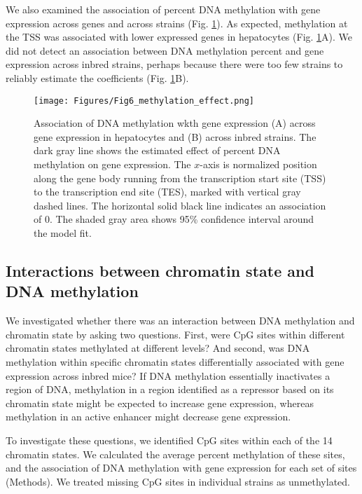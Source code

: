 \documentclass[
  11pt,
]{article}
\begin{document}
We also examined the association of percent DNA methylation with gene
expression across genes and across strains (Fig.
\ref{fig:DNA_methylation_effect}). As expected, methylation at the TSS
was associated with lower expressed genes in hepatocytes (Fig.
\ref{fig:DNA_methylation_effect}A). We did not detect an association
between DNA methylation percent and gene expression across inbred
strains, perhaps because there were too few strains to reliably estimate
the coefficients (Fig. \ref{fig:DNA_methylation_effect}B).

\begin{figure}[ht!]
\texttt{[image: Figures/Fig6\_methylation\_effect.png]} 
\caption{Association of DNA methylation wkth gene expression (A) across 
gene expression in hepatocytes and (B) across inbred strains. The dark 
gray line shows the estimated effect of percent DNA methylation on gene 
expression. The $x$-axis is normalized position along the gene body 
running from the transcription start site (TSS) to the transcription 
end site (TES), marked with vertical gray dashed lines. The horizontal 
solid black line indicates an association of 0. The shaded gray area shows 
95\% confidence interval around the model fit.}
\label{fig:DNA_methylation_effect}
\end{figure}

\hypertarget{interactions-between-chromatin-state-and-dna-methylation}{%
\subsection{Interactions between chromatin state and DNA
methylation}\label{interactions-between-chromatin-state-and-dna-methylation}}

We investigated whether there was an interaction between DNA methylation
and chromatin state by asking two questions. First, were CpG sites
within different chromatin states methylated at different levels? And
second, was DNA methylation within specific chromatin states
differentially associated with gene expression across inbred mice? If
DNA methylation essentially inactivates a region of DNA, methylation in
a region identified as a repressor based on its chromatin state might be
expected to increase gene expression, whereas methylation in an active
enhancer might decrease gene expression.

To investigate these questions, we identified CpG sites within each of
the 14 chromatin states. We calculated the average percent methylation
of these sites, and the association of DNA methylation with gene
expression for each set of sites (Methods). We treated missing CpG sites
in individual strains as unmethylated.
\end{document}
